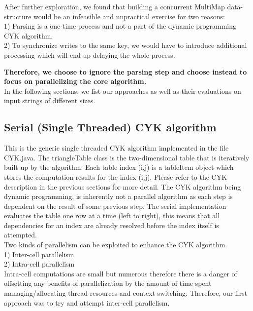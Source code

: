 \documentclass[12pt]{article}
\begin{document}
	\vspace{2 mm}
After further exploration, we found that building a concurrent MultiMap data-structure would be an infeasible and unpractical exercise for two reasons: \\
1)	Parsing is a one-time process and not a part of the dynamic programming CYK algorithm.\\
2)	To synchronize writes to the same key, we would have to introduce additional processing which will end up delaying the whole process. 

\vspace{5 mm}
{\bf Therefore, we choose to ignore the parsing step and choose instead to focus on parallelizing the core algorithm.}  \\
In the following sections, we list our approaches as well as their evaluations on input strings of different sizes. \\
\subsection{Serial (Single Threaded) CYK algorithm}
This is the generic single threaded CYK algorithm implemented in the file CYK.java. The triangleTable class is the two-dimensional table that is iteratively built up by the algorithm. Each table index (i,j) is a tableItem object which stores the computation results for the index (i,j). Please refer to the CYK description in the previous sections for more detail. The CYK algorithm being dynamic programming, is inherently not a parallel algorithm as each step is dependent on the result of some previous step. The serial implementation evaluates the table one row at a time (left to right), this means that all dependencies for an index are already resolved before the index itself is attempted. \\
Two kinds of parallelism can be exploited to enhance the CYK algorithm.\\
1)	Inter-cell parallelism\\
2)	Intra-cell parallelism\\
Intra-cell computations are small but numerous therefore there is a danger of offsetting any benefits of parallelization by the amount of time spent managing/allocating thread resources and context switching. Therefore, our first approach was to try and attempt inter-cell parallelism. 
\end{document}
